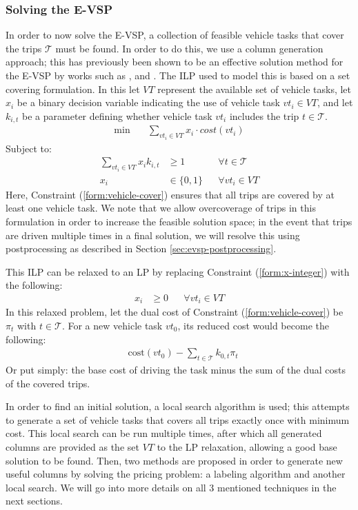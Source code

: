 \documentclass[]{article}
\begin{document}
\subsubsection{Solving the E-VSP}
In order to now solve the E-VSP, a collection of feasible vehicle tasks that cover the trips $\mathcal{T}$ must be found. In order to do this, we use a column generation approach; this has previously been shown to be an effective solution method for the E-VSP by works such as \citet{vanKootenNiekerk2017}, \citet{Zhang2021} and \citet{deVos2024}. The ILP used to model this is based on a set covering formulation. In this let $VT$ represent the available set of vehicle tasks, let $x_{i}$ be a binary decision variable indicating the use of vehicle task $vt_i \in VT$, and let $k_{i,t}$ be a parameter defining whether vehicle task $vt_i$ includes the trip $t \in \mathcal{T}$.
\begin{align}
\min \quad
& \sum_{vt_i \in VT} x_{i} \cdot cost(vt_i)
\end{align}
Subject to:
\begin{align}
\sum_{vt_i \in VT} x_{i}k_{i,t} &\geq 1 && \forall t \in \mathcal{T} \label{form:vehicle-cover}\\
x_{i} &\in \{ 0, 1 \} && \forall vt_i \in VT \label{form:x-integer}
\end{align}
Here, Constraint (\ref{form:vehicle-cover}) ensures that all trips are covered by at least one vehicle task. We note that we allow overcoverage of trips in this formulation in order to increase the feasible solution space; in the event that trips are driven multiple times in a final solution, we will resolve this using postprocessing as described in Section \ref{sec:evsp-postprocessing}.

This ILP can be relaxed to an LP by replacing Constraint (\ref{form:x-integer}) with the following:
\begin{align}
x_{i} &\geq 0 && \forall vt_i \in VT
\end{align}
In this relaxed problem, let the dual cost of Constraint (\ref{form:vehicle-cover}) be $\pi_t$ with $t \in \mathcal{T}$. For a new vehicle task $vt_0$, its reduced cost would become the following:
\begin{align}
& \text{cost}(vt_0) - \sum_{t \in \mathcal{T}} k_{0,t} \pi_{t} 
\end{align}
Or put simply: the base cost of driving the task minus the sum of the dual costs of the covered trips.

In order to find an initial solution, a local search algorithm is used; this attempts to generate a set of vehicle tasks that covers all trips exactly once with minimum cost. This local search can be run multiple times, after which all generated columns are provided as the set $VT$ to the LP relaxation, allowing a good base solution to be found. Then, two methods are proposed in order to generate new useful columns by solving the pricing problem: a labeling algorithm and another local search. We will go into more details on all 3 mentioned techniques in the next sections. 
\end{document}
